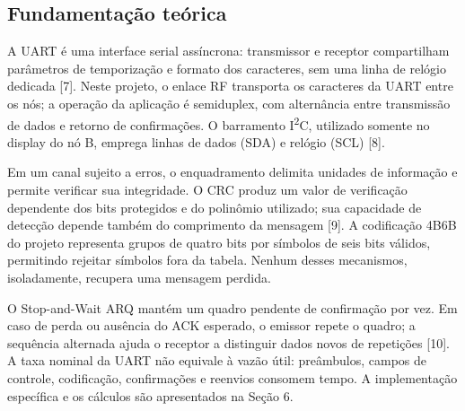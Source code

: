 \subsection{Fundamentação teórica}
A UART é uma interface serial assíncrona: transmissor e receptor compartilham parâmetros de temporização e formato dos caracteres, sem uma linha de relógio dedicada [7]. Neste projeto, o enlace RF transporta os caracteres da UART entre os nós; a operação da aplicação é semiduplex, com alternância entre transmissão de dados e retorno de confirmações. O barramento I\textsuperscript{2}C, utilizado somente no display do nó B, emprega linhas de dados (SDA) e relógio (SCL) [8].

Em um canal sujeito a erros, o enquadramento delimita unidades de informação e permite verificar sua integridade. O CRC produz um valor de verificação dependente dos bits protegidos e do polinômio utilizado; sua capacidade de detecção depende também do comprimento da mensagem [9]. A codificação 4B6B do projeto representa grupos de quatro bits por símbolos de seis bits válidos, permitindo rejeitar símbolos fora da tabela. Nenhum desses mecanismos, isoladamente, recupera uma mensagem perdida.

O Stop-and-Wait ARQ mantém um quadro pendente de confirmação por vez. Em caso de perda ou ausência do ACK esperado, o emissor repete o quadro; a sequência alternada ajuda o receptor a distinguir dados novos de repetições [10]. A taxa nominal da UART não equivale à vazão útil: preâmbulos, campos de controle, codificação, confirmações e reenvios consomem tempo. A implementação específica e os cálculos são apresentados na Seção 6.
